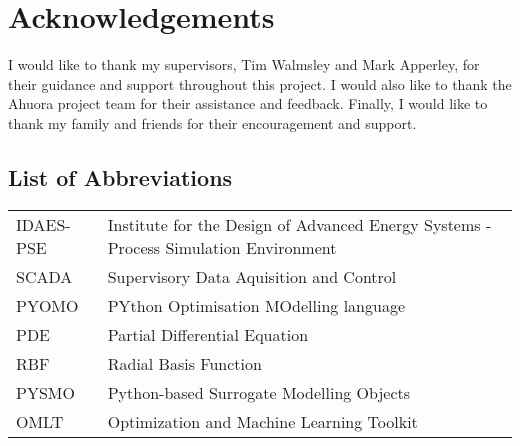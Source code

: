 \documentclass[12pt]{report}
\begin{document}

\chapter*{Acknowledgements}

I would like to thank my supervisors, Tim Walmsley and Mark Apperley, for their guidance and support throughout this project. I would also like to thank the Ahuora project team for their assistance and feedback. Finally, I would like to thank my family and friends for their encouragement and support.

\tableofcontents
\listoffigures
\listoftables

\section*{List of Abbreviations}

\begin{tabular}{lL{13cm}}
    IDAES-PSE & Institute for the Design of Advanced Energy Systems - Process Simulation Environment \\
    SCADA & Supervisory Data Aquisition and Control \\
    PYOMO & PYthon Optimisation MOdelling language \\
    PDE & Partial Differential Equation \\
    RBF & Radial Basis Function \\
    PYSMO & Python-based Surrogate Modelling Objects \\
    OMLT & Optimization and Machine Learning Toolkit \\
\end{tabular}

\newpage
{}















\end{document}
